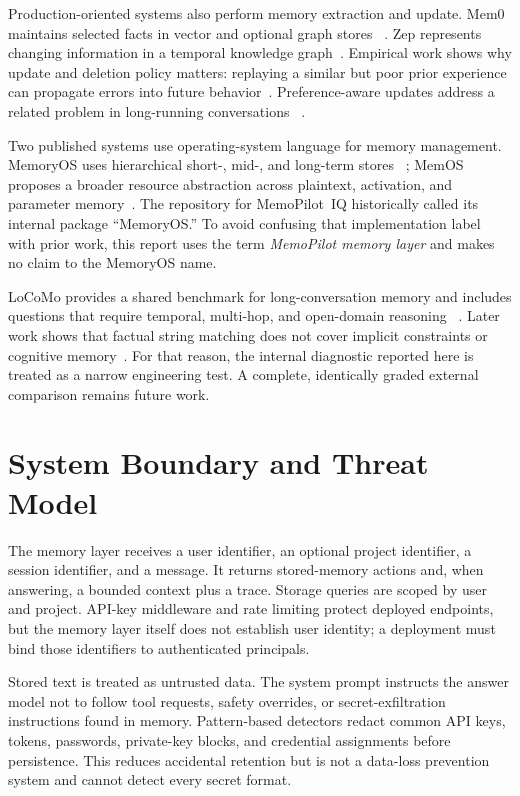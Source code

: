 \documentclass[11pt]{article}
\newcommand{\sysname}{MemoPilot~IQ}
\begin{document}
Production-oriented systems also perform memory extraction and update. Mem0
maintains selected facts in vector and optional graph stores
~\citep{chhikara2025mem0}. Zep represents changing information in a temporal
knowledge graph~\citep{rasmussen2025zep}. Empirical work shows why update and
deletion policy matters: replaying a similar but poor prior experience can
propagate errors into future behavior~\citep{xiong2026memory}. Preference-aware
updates address a related problem in long-running conversations
~\citep{sun2026preference}.

Two published systems use operating-system language for memory management.
MemoryOS uses hierarchical short-, mid-, and long-term stores
~\citep{kang2025memoryos}; MemOS proposes a broader resource abstraction across
plaintext, activation, and parameter memory~\citep{li2025memos}. The repository
for \sysname{} historically called its internal package ``MemoryOS.'' To avoid
confusing that implementation label with prior work, this report uses the term
\emph{MemoPilot memory layer} and makes no claim to the MemoryOS name.

LoCoMo provides a shared benchmark for long-conversation memory and includes
questions that require temporal, multi-hop, and open-domain reasoning
~\citep{maharana2024locomo}. Later work shows that factual string matching does
not cover implicit constraints or cognitive memory~\citep{li2026locomoplus}.
For that reason, the internal diagnostic reported here is treated as a narrow
engineering test. A complete, identically graded external comparison remains
future work.

\section{System Boundary and Threat Model}
\label{sec:threat}

The memory layer receives a user identifier, an optional project identifier, a
session identifier, and a message. It returns stored-memory actions and, when
answering, a bounded context plus a trace. Storage queries are scoped by user
and project. API-key middleware and rate limiting protect deployed endpoints,
but the memory layer itself does not establish user identity; a deployment must
bind those identifiers to authenticated principals.

Stored text is treated as untrusted data. The system prompt instructs the answer
model not to follow tool requests, safety overrides, or secret-exfiltration
instructions found in memory. Pattern-based detectors redact common API keys,
tokens, passwords, private-key blocks, and credential assignments before
persistence. This reduces accidental retention but is not a data-loss
prevention system and cannot detect every secret format.
\end{document}
